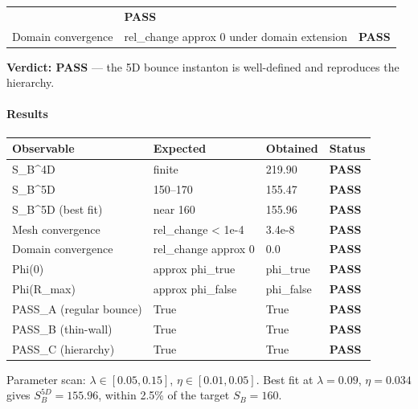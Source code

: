 \documentclass[
  11pt,
]{article}
\begin{document}
\begin{longtable}[]{@{}lll@{}}
\begin{minipage}[t]{0.30\columnwidth}
\end{minipage} & \begin{minipage}[t]{0.30\columnwidth}\raggedright
\textbf{PASS}\strut
\end{minipage}\tabularnewline
\begin{minipage}[t]{0.30\columnwidth}\raggedright
Domain convergence\strut
\end{minipage} & \begin{minipage}[t]{0.30\columnwidth}\raggedright
rel\_change approx 0 under domain extension\strut
\end{minipage} & \begin{minipage}[t]{0.30\columnwidth}\raggedright
\textbf{PASS}\strut
\end{minipage}\tabularnewline
\bottomrule
\end{longtable}

\textbf{Verdict: PASS} --- the 5D bounce instanton is well-defined and
reproduces the hierarchy.

\bigskip

\hypertarget{results-7}{%
\paragraph{Results}\label{results-7}}

\begin{longtable}[]{@{}llll@{}}
\toprule
Observable & Expected & Obtained & Status\tabularnewline
\midrule
\endhead
S\_B\^{}4D & finite & 219.90 & \textbf{PASS}\tabularnewline
S\_B\^{}5D & 150--170 & 155.47 & \textbf{PASS}\tabularnewline
S\_B\^{}5D (best fit) & near 160 & 155.96 & \textbf{PASS}\tabularnewline
Mesh convergence & rel\_change \textless{} 1e-4 & 3.4e-8 &
\textbf{PASS}\tabularnewline
Domain convergence & rel\_change approx 0 & 0.0 &
\textbf{PASS}\tabularnewline
Phi(0) & approx phi\_true & phi\_true & \textbf{PASS}\tabularnewline
Phi(R\_max) & approx phi\_false & phi\_false &
\textbf{PASS}\tabularnewline
PASS\_A (regular bounce) & True & True & \textbf{PASS}\tabularnewline
PASS\_B (thin-wall) & True & True & \textbf{PASS}\tabularnewline
PASS\_C (hierarchy) & True & True & \textbf{PASS}\tabularnewline
\bottomrule
\end{longtable}

Parameter scan: \(\lambda \in [0.05, 0.15]\), \(\eta \in [0.01, 0.05]\).
Best fit at \(\lambda = 0.09\), \(\eta = 0.034\) gives
\(S_B^{5D} = 155.96\), within 2.5\% of the target \(S_B = 160\).

\bigskip
\end{document}

